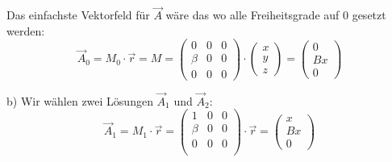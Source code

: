 \documentclass[11pt a4paper]{article}
\begin{document}
Das einfachste Vektorfeld für $\vec A$ wäre das wo alle Freiheitsgrade auf 
0 gesetzt werden:
\[
	\vec A_0 = M_0 \cdot \vec r = 
	M = \begin{pmatrix}
		0 &0 &0 \\ \beta &0 &0 \\ 0 &0 &0
	\end{pmatrix}
	\cdot \begin{pmatrix}
		x \\ y \\ z
	\end{pmatrix}
	= 
	\begin{pmatrix}
		0 \\ Bx \\0
	\end{pmatrix}
\]


b) Wir wählen zwei Lösungen $\vec A_1$ und $\vec A_2$:
\[
	\vec A_1 = M_1 \cdot \vec r = \begin{pmatrix}
		1 &0 &0 \\
		\beta &0 &0 \\
		0 &0 &0 \\
	\end{pmatrix}
	\cdot \vec r
	= \begin{pmatrix}
		x \\Bx \\0
	\end{pmatrix}
\]
\end{document}
